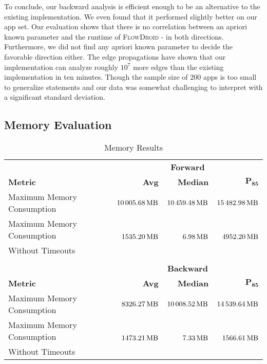 \documentclass[../draft.tex]{subfiles}
\begin{document}
    To conclude, our backward analysis is efficient enough to be an alternative to the existing implementation.
    We even found that it performed slightly better on our app set.
    Our evaluation shows that there is no correlation between an apriori known parameter and the runtime of \textsc{FlowDroid} - in both directions.
    Furthermore, we did not find any apriori known parameter to decide the favorable direction either.
    The edge propagations have shown that our implementation can analyze roughly $10^7$ more edges than the existing implementation in ten minutes. Though the sample size of 200 apps is too small to generalize statements and our data was somewhat challenging to interpret with a significant standard deviation.

    \FloatBarrier
    \subsection{Memory Evaluation}\label{s:memex}

    \begin{table}[tbp]
        \centering
        \begin{tabular}{l | r | r | r}
            & \multicolumn{3}{c}{\textbf{Forward}}\\
            \textbf{Metric} & \textbf{Avg} & \textbf{Median} & $\mathbf{P_{85}}$\\
            \hline\hline
            Maximum Memory Consumption & $\SI{10005.68}{\mega\byte}$ & $\SI{10459.48}{\mega\byte}$ & $\SI{15482.98}{\mega\byte}$\\
            \hline
            Maximum Memory Consumption & \multirow{2}{*}{$\SI{1535.20}{\mega\byte}$} & \multirow{2}{*}{$\SI{6.98}{\mega\byte}$} & \multirow{2}{*}{$\SI{4952.20}{\mega\byte}$}\\
            Without Timeouts & & &\\            
            \multicolumn{4}{c}{}\\
            & \multicolumn{3}{c}{\textbf{Backward}}\\
            \textbf{Metric} & \textbf{Avg} & \textbf{Median} & $\mathbf{P_{85}}$\\
            \hline\hline
            Maximum Memory Consumption & $\SI{8326.27}{\mega\byte}$ & $\SI{10008.52}{\mega\byte}$ & $\SI{14539.64}{\mega\byte}$\\
            \hline
            Maximum Memory Consumption & \multirow{2}{*}{$\SI{1473.21}{\mega\byte}$} & \multirow{2}{*}{$\SI{7.33}{\mega\byte}$} & \multirow{2}{*}{$\SI{1566.61}{\mega\byte}$}\\
            Without Timeouts & & &\\
        \end{tabular}
        \caption{Memory Results}
        \label{t:memres}
    \end{table}
\end{document}
